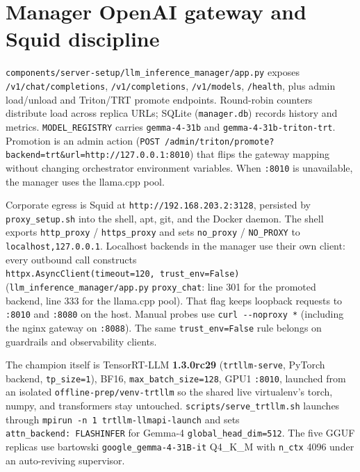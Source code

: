 \section{Manager OpenAI gateway and Squid discipline}\label{manager-openai-gateway-and-squid-discipline}

\texttt{components/server-setup/llm\_inference\_manager/app.py} exposes \texttt{/v1/chat/completions}, \texttt{/v1/completions}, \texttt{/v1/models}, \texttt{/health}, plus admin load/unload and Triton/TRT promote endpoints. Round-robin counters distribute load across replica URLs; SQLite (\texttt{manager.db}) records history and metrics. \texttt{MODEL\_REGISTRY} carries \texttt{gemma-4-31b} and \texttt{gemma-4-31b-triton-trt}. Promotion is an admin action (\texttt{POST\ /admin/triton/promote?backend=trt\&url=http://127.0.0.1:8010}) that flips the gateway mapping without changing orchestrator environment variables. When \texttt{:8010} is unavailable, the manager uses the llama.cpp pool.

Corporate egress is Squid at \texttt{http://192.168.203.2:3128}, persisted by \texttt{proxy\_setup.sh} into the shell, apt, git, and the Docker daemon. The shell exports \texttt{http\_proxy} / \texttt{https\_proxy} and sets \texttt{no\_proxy} / \texttt{NO\_PROXY} to \texttt{localhost,127.0.0.1}. Localhost backends in the manager use their own client: every outbound call constructs \texttt{httpx.AsyncClient(timeout=120,\ trust\_env=False)} (\texttt{llm\_inference\_manager/app.py} \texttt{proxy\_chat}: line 301 for the promoted backend, line 333 for the llama.cpp pool). That flag keeps loopback requests to \texttt{:8010} and \texttt{:8080} on the host. Manual probes use \texttt{curl\ -\/-noproxy\ \textquotesingle{}*\textquotesingle{}} (including the nginx gateway on \texttt{:8088}). The same \texttt{trust\_env=False} rule belongs on guardrails and observability clients.

The champion itself is TensorRT-LLM \textbf{1.3.0rc29} (\texttt{trtllm-serve}, PyTorch backend, \texttt{tp\_size=1}), BF16, \texttt{max\_batch\_size=128}, GPU1 \texttt{:8010}, launched from an isolated \texttt{offline-prep/venv-trtllm} so the shared live virtualenv's torch, numpy, and transformers stay untouched. \texttt{scripts/serve\_trtllm.sh} launches through \texttt{mpirun\ -n\ 1\ trtllm-llmapi-launch} and sets \texttt{attn\_backend:\ FLASHINFER} for Gemma-4 \texttt{global\_head\_dim=512}. The five GGUF replicas use bartowski \texttt{google\_gemma-4-31B-it} Q4\_K\_M with \texttt{n\_ctx} 4096 under an auto-reviving supervisor.

